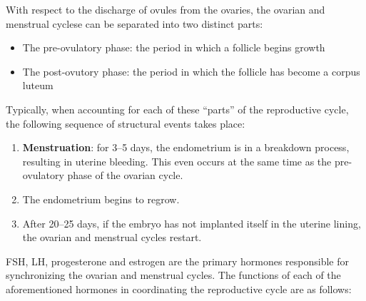 \documentclass{article}
\begin{document}
With respect to the discharge of ovules from the ovaries, the ovarian and
menstrual cyclese can be separated into two distinct parts:

\begin{itemize}
	\item The pre-ovulatory phase: the period in which a follicle begins
		growth
	\item The post-ovutory phase: the period in which the follicle has
		become a corpus luteum
\end{itemize}

Typically, when accounting for each of these ``parts'' of the reproductive cycle,
the following sequence of structural events takes place:

\begin{enumerate}
	\item \textbf{Menstruation}: for 3--5 days, the endometrium is in a breakdown
		process, resulting in uterine bleeding. This even occurs at the same time
		as the pre-ovulatory phase of the ovarian cycle.
	\item The endometrium begins to regrow.
	\item After 20--25 days, if the
		embryo has not implanted itself in the uterine lining, the ovarian and menstrual
		cycles restart.
\end{enumerate}

FSH, LH, progesterone and estrogen are the primary hormones responsible for
synchronizing the ovarian and menstrual cycles. The functions of each of the
aforementioned hormones in coordinating the reproductive cycle are as follows:
\end{document}
